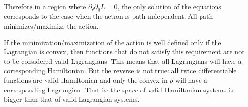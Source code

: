 \documentclass[aps,pra,10pt,twocolumn,floatfix,nofootinbib]{revtex4-1}
\theoremstyle{definition}
\begin{document}
Therefore in a region where $\partial_{\dot{q}}\partial_{\dot{q}}L = 0$, the only solution of the equations corresponds to the case when the action is path independent. All path minimizes/maximize the action.

If the minimization/maximization of the action is well defined only if the Lagrangian is convex, then functions that do not satisfy this requirement are not to be considered valid Lagrangians. This means that all Lagrangians will have a corresponding Hamiltonian. But the reverse is not true: all twice differentiable functions are valid Hamiltonian and only the convex in $p$ will have a corresponding Lagrangian. That is: the space of valid Hamiltonian systems is bigger than that of valid Lagrangian systems.
\end{document}
